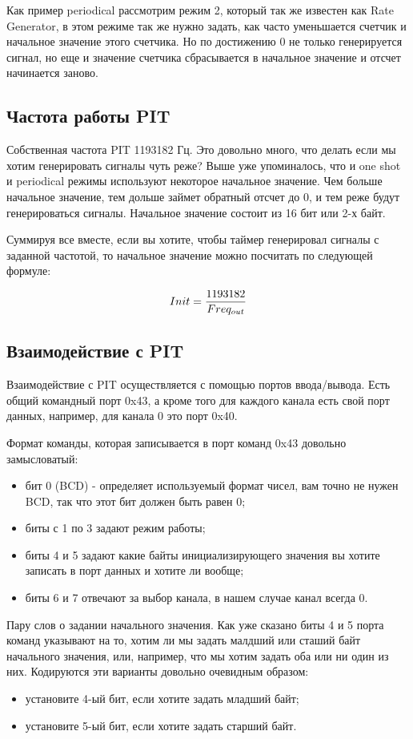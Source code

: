 Как пример periodical рассмотрим режим 2, который так же известен как Rate
Generator, в этом режиме так же нужно задать, как часто уменьшается счетчик и
начальное значение этого счетчика. Но по достижению 0 не только генерируется
сигнал, но еще и значение счетчика сбрасывается в начальное значение и отсчет
начинается заново.

\subsection{Частота работы PIT}

Собственная частота PIT 1193182 Гц. Это довольно много, что делать если мы хотим
генерировать сигналы чуть реже? Выше уже упоминалось, что и one shot и
periodical режимы используют некоторое начальное значение. Чем больше начальное
значение, тем дольше займет обратный отсчет до 0, и тем реже будут
генерироваться сигналы. Начальное значение состоит из 16 бит или 2-х байт.

Суммируя все вместе, если вы хотите, чтобы таймер генерировал сигналы с заданной
частотой, то начальное значение можно посчитать по следующей формуле:

\[
  Init = {1193182\over Freq_{out}}
\]

\subsection{Взаимодействие с PIT}

Взаимодействие с PIT осуществляется с помощью портов ввода/вывода. Есть общий
командный порт 0x43, а кроме того для каждого канала есть свой порт данных,
например, для канала 0 это порт 0x40.

Формат команды, которая записывается в порт команд 0x43 довольно замысловатый:
\begin{itemize}
  \item бит 0 (BCD) - определяет используемый формат чисел, вам точно не нужен
  BCD, так что этот бит должен быть равен 0;
  \item биты с 1 по 3 задают режим работы;
  \item биты 4 и 5 задают какие байты инициализирующего значения вы хотите
  записать в порт данных и хотите ли вообще;
  \item биты 6 и 7 отвечают за выбор канала, в нашем случае канал всегда 0.
\end{itemize}

Пару слов о задании начального значения. Как уже сказано биты 4 и 5 порта команд
указывают на то, хотим ли мы задать малдший или сташий байт начального значения,
или, например, что мы хотим задать оба или ни один из них. Кодируются эти
варианты довольно очевидным образом:
\begin{itemize}
  \item установите 4-ый бит, если хотите задать младший байт;
  \item установите 5-ый бит, если хотите задать старший байт.
\end{itemize}

